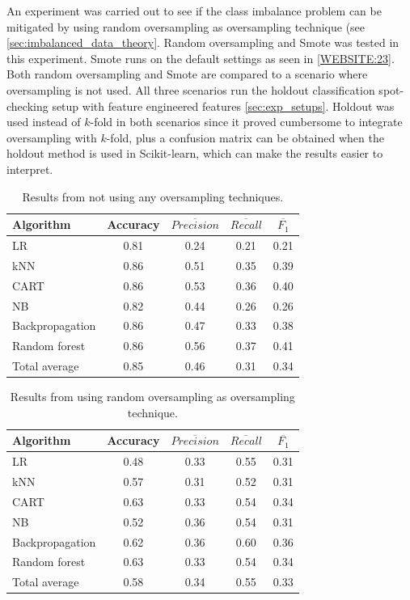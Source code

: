 	An experiment was carried out to see if the class imbalance problem can be mitigated by using random oversampling as oversampling technique (see \ref{sec:imbalanced_data_theory}. Random oversampling and Smote was tested in this experiment. Smote runs on the default settings as seen in \ref{WEBSITE:23}. Both random oversampling and Smote are compared to a scenario where oversampling is not used. All three scenarios run the holdout classification spot-checking setup with feature engineered features \ref{sec:exp_setups}. Holdout was used instead of $k$-fold in both scenarios since it proved cumbersome to integrate oversampling with $k$-fold, plus a confusion matrix can be obtained when the holdout method is used in Scikit-learn, which can make the results easier to interpret. 

	\begin{table}[H]
	\centering
	\caption{Results from not using any oversampling techniques. }
		\begin{tabular}[5]{l | c | c | c | c}
    			Algorithm & Accuracy & $\overline{Precision}$ & $\overline{Recall}$ & $\overline{F_1}$ \\
    			\hline
			LR & 0.81 & 0.24 & 0.21 & 0.21  \\
			kNN & 0.86 & 0.51 & 0.35 & 0.39  \\
			CART & 0.86 & 0.53 & 0.36 & 0.40 \\
			NB & 0.82 & 0.44 & 0.26 & 0.26  \\
			Backpropagation & 0.86 & 0.47 & 0.33 &  0.38  \\
			Random forest & 0.86 & 0.56 & 0.37 & 0.41  \\
			\hline
			Total average & 0.85 & 0.46 & 0.31 & 0.34
			\label{table:no_oversampling}
		\end{tabular}
	\end{table}

	\begin{table}[H]
	\centering
	\caption{Results from using random oversampling as oversampling technique.}
		\begin{tabular}[5]{l | c | c | c | c}
    			Algorithm & Accuracy & $\overline{Precision}$ & $\overline{Recall}$ & $\overline{F_1}$ \\
    			\hline
			LR & 0.48 & 0.33 & 0.55 & 0.31 \\
			kNN & 0.57 &  0.31 & 0.52 &  0.31 \\
			CART & 0.63 & 0.33 & 0.54 &  0.34 \\
			NB &  0.52 & 0.36 & 0.54 & 0.31 \\
			Backpropagation & 0.62 & 0.36 & 0.60 & 0.36 \\
			Random forest & 0.63 & 0.33 & 0.54 &  0.34 \\
			\hline
			Total average & 0.58 & 0.34 & 0.55 & 0.33 
			\label{table:random_oversampling}
		\end{tabular}
	\end{table}

